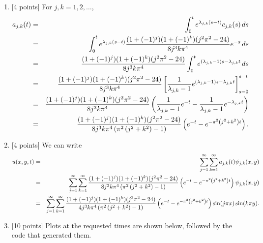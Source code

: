 \begin{solution}
\begin{enumerate}
\item {[4 points]} For $j,k=1,2,\ldots$,
\begin{eqnarray*}
a_{j,k}(t) &=& \int_0^t e^{\lambda_{j,k}\left(s-t\right)} c_{j,k}(s)\,ds
\\
&=& \int_0^t e^{\lambda_{j,k}\left(s-t\right)} {(1+(-1)^j)(1+(-1)^k) (j^2\pi^2-24)\over 8 j^3 k \pi^4} e^{-s}\,ds
\\
&=& {(1+(-1)^j)(1+(-1)^k) (j^2\pi^2-24)\over 8 j^3 k \pi^4} \int_0^t e^{\left(\lambda_{j,k}-1\right)s-\lambda_{j,k}t}\,ds
\\
&=& {(1+(-1)^j)(1+(-1)^k) (j^2\pi^2-24)\over 8 j^3 k \pi^4} \left[{1 \over \lambda_{j,k}-1}e^{\left(\lambda_{j,k}-1\right)s-\lambda_{j,k}t}\right]_{s=0}^{s=t}
\\
&=& {(1+(-1)^j)(1+(-1)^k) (j^2\pi^2-24)\over 8 j^3 k \pi^4} \left({1 \over \lambda_{j,k}-1}e^{-t}-{1 \over \lambda_{j,k}-1}e^{-\lambda_{j,k}t}\right)
\\
&=& {(1+(-1)^j)(1+(-1)^k) (j^2\pi^2-24)\over 8 j^3 k \pi^4\left(\pi^2\left(j^2+k^2\right)-1\right)} \left(e^{-t}-e^{-\pi^2\left(j^2+k^2\right)t}\right).
\end{eqnarray*}

\item {[4 points]} We can write
\begin{eqnarray*}
u(x,y,t) &=& \sum_{j=1}^\infty \sum_{k=1}^\infty a_{j,k}(t) \psi_{j,k}(x,y)
\\
&=& \sum_{j=1}^\infty \sum_{k=1}^\infty {(1+(-1)^j)(1+(-1)^k) (j^2\pi^2-24)\over 8 j^3 k \pi^4\left(\pi^2\left(j^2+k^2\right)-1\right)} \left(e^{-t}-e^{-\pi^2\left(j^2+k^2\right)t}\right) \psi_{j,k}(x,y)
\\
&=& \sum_{j=1}^\infty \sum_{k=1}^\infty {(1+(-1)^j)(1+(-1)^k) (j^2\pi^2-24)\over 4 j^3 k \pi^4\left(\pi^2\left(j^2+k^2\right)-1\right)} \left(e^{-t}-e^{-\pi^2\left(j^2+k^2\right)t}\right) \sin(j\pi x)\sin(k\pi y).
\end{eqnarray*}

\item {[10 points]} Plots at the requested times are shown below, followed by the code that
generated them.


\end{enumerate}
\end{solution}
